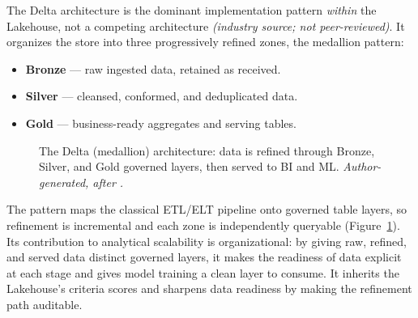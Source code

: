 The Delta architecture is the dominant implementation pattern \textit{within} the Lakehouse, not a competing architecture \parencite{databricks2022} \textit{(industry source; not peer-reviewed)}. It organizes the store into three progressively refined zones, the medallion pattern:

\begin{itemize}[noitemsep, topsep=4pt]
  \item \textbf{Bronze} --- raw ingested data, retained as received.
  \item \textbf{Silver} --- cleansed, conformed, and deduplicated data.
  \item \textbf{Gold} --- business-ready aggregates and serving tables.
\end{itemize}

\begin{figure}[H]
\centering
{}
\caption{The Delta (medallion) architecture: data is refined through Bronze, Silver, and Gold governed layers, then served to BI and ML. \textit{Author-generated, after \parencite{databricks2022}.}}
\label{fig:ch2-medallion}
\end{figure}

\noindent The pattern maps the classical ETL/ELT pipeline \parencite{vassiliadis2009} onto governed table layers, so refinement is incremental and each zone is independently queryable (Figure~\ref{fig:ch2-medallion}). Its contribution to analytical scalability is organizational: by giving raw, refined, and served data distinct governed layers, it makes the readiness of data explicit at each stage and gives model training a clean layer to consume. It inherits the Lakehouse's criteria scores and sharpens data readiness by making the refinement path auditable.

